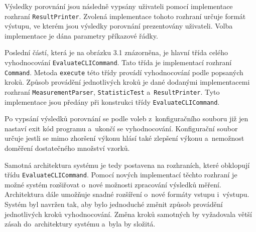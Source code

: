 Výsledky porovnání jsou následně vypsány uživateli pomocí implementace rozhraní \lstinline|ResultPrinter|.
Zvolená implementace tohoto rozhraní určuje formát výstupu, ve kterém jsou výsledky porovnání prezentovány uživateli.
Volba implementace je dána parametry příkazové řádky.

Poslední částí, která je na obrázku 3.1 znázorněna, je hlavní třída celého vyhodnocování \lstinline|EvaluateCLICommand|.
Tato třída je implementací rozhraní \lstinline|Command|. Metoda \lstinline|execute| této třídy
provádí vyhodnocování podle popsaných kroků. Způsob provádění jednotlivých kroků je dané
dodanými implementacemi rozhraní \lstinline|MeasurementParser|, \lstinline|StatisticTest| a~\lstinline|ResultPrinter|.
Tyto implementace jsou předány při konstrukci třídy \lstinline|EvaluateCLICommand|.

Po vypsání výsledků porovnání se podle voleb z~konfiguračního souboru již jen nastaví exit kód programu a~ukončí se vyhodnocování.
Konfigurační soubor určuje jestli se mimo zhoršení výkonu hlásí také zlepšení výkonu a~nemožnost doměření dostatečného množství vzorků.

Samotná architektura systému je tedy postavena na rozhraních, které obklopují třídu \lstinline|EvaluateCLICommand|.
Pomocí nových implementací těchto rozhraní je možné systém rozšiřovat o~nové možnosti zpracování výsledků měření.
Architektura dále umožňuje snadné rozšíření o~nové formáty vstupu i~výstupu. Systém byl navržen tak, aby bylo
jednoduché změnit způsob provádění jednotlivých kroků vyhodnocování. Změna kroků samotných by vyžadovala
větší zásah do~architektury systému a~byla by složitá.


